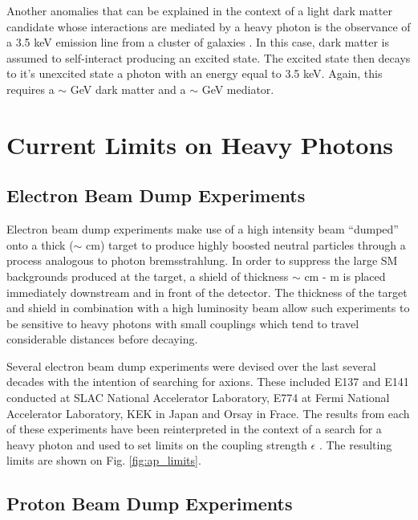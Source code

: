 Another anomalies that can be explained in the context of a light dark matter
candidate whose interactions are mediated by a heavy photon is the observance
of a 3.5 keV emission line from a cluster of galaxies \cite{}.  In this case, 
dark matter is assumed to self-interact producing an excited state.  The excited
state then decays to it's unexcited state a photon with an energy equal to 3.5 keV.
Again, this requires a $\sim$ GeV dark matter and a $\sim$ GeV mediator.

\section{Current Limits on Heavy Photons}

\subsection{Electron Beam Dump Experiments}

Electron beam dump experiments make use of a high intensity beam ``dumped'' onto
a thick ($\sim$ cm) target to produce highly boosted neutral particles through a 
process analogous to photon bremsstrahlung.  In order to suppress the large
SM backgrounds produced at the target, a shield of thickness $\sim$ cm - m
is placed immediately downstream and in front of the detector.
The thickness of the target and shield in combination with a high luminosity
beam allow such experiments to be sensitive to heavy photons with small 
couplings which tend to travel considerable distances before decaying.

Several electron beam dump experiments were devised over the last several decades with
the intention of searching for axions.  These included E137 \cite{bjorken1988}
and E141 \cite{riordan1987} conducted at SLAC National Accelerator Laboratory,
E774 \cite{bross1991} at Fermi National Accelerator Laboratory, 
KEK \cite{konaka1986} in Japan and Orsay \cite{davier1989} in Frace. 
The results from each of these experiments have been reinterpreted in the 
context of a search for a heavy photon and used to set limits on the coupling
strength $\epsilon$ \cite{bjorken2009, andreas2012}.  The resulting limits are 
shown on Fig. \ref{fig:ap_limits}.

\subsection{Proton Beam Dump Experiments}

